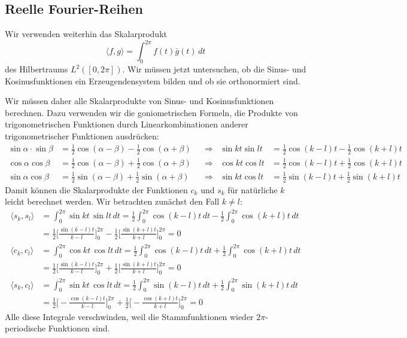 \subsection{Reelle Fourier-Reihen}
\label{subsection:real-fourier-series}
Wir verwenden weiterhin das Skalarprodukt
\[
\langle f,g\rangle
=
\int_0^{2\pi} f(t) \bar{g}(t)\,dt
\]
des Hilbertraums $L^2([0,2\pi])$.
Wir müssen jetzt untersuchen, ob die Sinus- und Kosinusfunktionen
ein Erzeugendensystem bilden und ob sie orthonormiert sind.

Wir müssen daher alle Skalarprodukte von Sinus- und Kosinusfunktionen
berechnen.
%
Dazu verwenden wir die goniometrischen Formeln, die Produkte von
trigonometrischen Funktionen durch Linearkombinationen anderer
trigonometrischer Funktionen ausdrücken:
\begin{align*}
\sin\alpha\cdot \sin\beta
&=
\frac12 \cos(\alpha-\beta) - \frac12\cos(\alpha+\beta)
&&\Rightarrow&
\sin kt \sin lt
&=
\frac12 \cos(k-l)t - \frac12\cos(k+l)t
\\
\cos\alpha \cos\beta
&=
\frac12\cos(\alpha-\beta) +\frac12\cos(\alpha+\beta)
&&\Rightarrow&
\cos kt \cos lt
&=
\frac12\cos(k-l)t + \frac12\cos(k+l)t
\\
\sin\alpha\cos\beta
&=
\frac12\sin(\alpha-\beta) + \frac12\sin(\alpha+\beta)
&&\Rightarrow&
\sin kt\cos lt
&=
\frac12\sin(k-l)t + \frac12\sin(k+l)t
\end{align*}
Damit können die Skalarprodukte der Funktionen $c_k$ und $s_k$ für natürliche
$k$ leicht berechnet werden.
Wir betrachten zunächst den Fall $k\ne l$:
\begin{align*}
\langle s_k, s_l\rangle
&=
\int_0^{2\pi} \sin kt\, \sin lt \,dt
=
\frac12\int_0^{2\pi} \cos(k-l)t\,dt
-
\frac12\int_0^{2\pi} \cos(k+l)t\,dt
\\
&=
\frac12\biggl[ \frac{\sin(k-l)t}{k-l} \biggr]_0^{2\pi}
-
\frac12\biggl[ \frac{\sin(k+l)t}{k+l} \biggr]_0^{2\pi}
=
0
\\
\langle c_k, c_l\rangle
&=
\int_0^{2\pi} \cos kt\, \cos lt \,dt
=
\frac12\int_0^{2\pi}\cos(k-l)t\,dt
+
\frac12\int_0^{2\pi}\cos(k+l)t\,dt
\\
&=
\frac12\biggl[ \frac{\sin (k-l)t}{k-l}\biggr]_0^{2\pi}
+
\frac12\biggl[ \frac{\sin (k+l)t}{k+l}\biggr]_0^{2\pi}
=
0
\\
\langle s_k, c_l\rangle
&=
\int_0^{2\pi} \sin kt\, \cos lt \,dt
=
\frac12\int_0^{2\pi} \sin(k-l)t\,dt
+
\frac12\int_0^{2\pi} \sin(k+l)t\,dt
\\
&=
\frac12\biggl[-\frac{\cos(k-l)t}{k-l}\biggr]_0^{2\pi}
+
\frac12\biggl[-\frac{\cos(k+l)t}{k+l}\biggr]_0^{2\pi}
=
0
\end{align*}
Alle diese Integrale verschwinden, weil die Stammfunktionen wieder
$2\pi$-periodische Funktionen sind.

